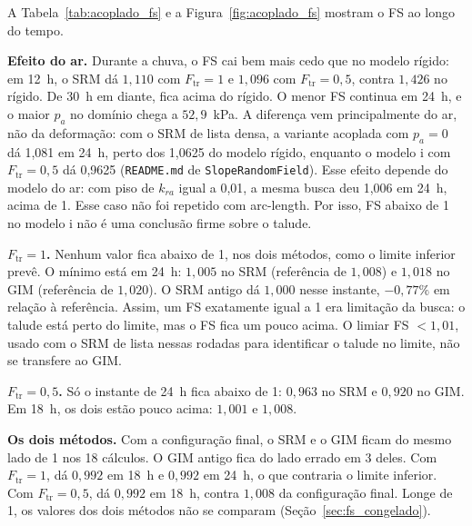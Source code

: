 \documentclass[11pt,a4paper]{article}
\numberwithin{equation}{section}
\begin{document}
A Tabela~\ref{tab:acoplado_fs} e a Figura~\ref{fig:acoplado_fs} mostram o FS ao longo do tempo.

\textbf{Efeito do ar.} Durante a chuva, o FS cai bem mais cedo que no modelo rígido: em 12~h, o SRM dá $1{,}110$ com $F_{\mathrm{tr}} = 1$ e $1{,}096$ com $F_{\mathrm{tr}} = 0{,}5$, contra $1{,}426$ no rígido. De 30~h em diante, fica acima do rígido. O menor FS continua em 24~h, e o maior $p_a$ no domínio chega a $52{,}9$~kPa. A diferença vem principalmente do ar, não da deformação: com o SRM de lista densa, a variante acoplada com $p_a = 0$ dá 1,081 em 24~h, perto dos 1,0625 do modelo rígido, enquanto o modelo i com $F_{\mathrm{tr}} = 0{,}5$ dá 0,9625 (\texttt{README.md} de \texttt{SlopeRandomField}). Esse efeito depende do modelo do ar: com piso de $k_{ra}$ igual a 0,01, a mesma busca deu 1,006 em 24~h, acima de 1. Esse caso não foi repetido com arc-length. Por isso, FS abaixo de 1 no modelo i não é uma conclusão firme sobre o talude.

\textbf{$F_{\mathrm{tr}} = 1$.} Nenhum valor fica abaixo de 1, nos dois métodos, como o limite inferior prevê. O mínimo está em 24~h: $1{,}005$ no SRM (referência de $1{,}008$) e $1{,}018$ no GIM (referência de $1{,}020$). O SRM antigo dá $1{,}000$ nesse instante, $-0{,}77\%$ em relação à referência. Assim, um FS exatamente igual a 1 era limitação da busca: o talude está perto do limite, mas o FS fica um pouco acima. O limiar FS $< 1{,}01$, usado com o SRM de lista nessas rodadas para identificar o talude no limite, não se transfere ao GIM.

\textbf{$F_{\mathrm{tr}} = 0{,}5$.} Só o instante de 24~h fica abaixo de 1: $0{,}963$ no SRM e $0{,}920$ no GIM. Em 18~h, os dois estão pouco acima: $1{,}001$ e $1{,}008$.

\textbf{Os dois métodos.} Com a configuração final, o SRM e o GIM ficam do mesmo lado de 1 nos 18 cálculos. O GIM antigo fica do lado errado em 3 deles. Com $F_{\mathrm{tr}} = 1$, dá $0{,}992$ em 18~h e $0{,}992$ em 24~h, o que contraria o limite inferior. Com $F_{\mathrm{tr}} = 0{,}5$, dá $0{,}992$ em 18~h, contra $1{,}008$ da configuração final. Longe de 1, os valores dos dois métodos não se comparam (Seção~\ref{sec:fs_congelado}).
\end{document}
